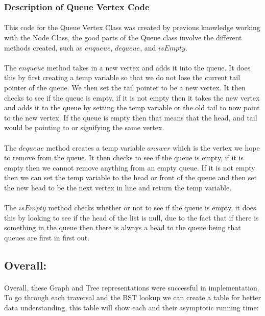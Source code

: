\documentclass[letterpaper, 10pt,DIV=13]{scrartcl}
\numberwithin{equation}{section} %
\numberwithin{figure}{section} %
\numberwithin{table}{section} %
\begin{document}
\subsubsection{Description of Queue Vertex Code}
\paragraph{} This code for the Queue Vertex Class was created by previous knowledge working with the Node Class, the good parts of the Queue class involve the different methods created, such as $enqueue$, $dequeue$, and $isEmpty$.
\paragraph{} The $enqueue$ method takes in a new vertex and adds it into the queue. It does this by first creating a temp variable so that we do not lose the current tail pointer of the queue. We then set the tail pointer to be a new vertex. It then checks to see if the queue is empty, if it is not empty then it takes the new vertex and adds it to the queue by setting the temp variable or the old tail to now point to the new vertex. If the queue is empty then that means that the head, and tail would be pointing to or signifying the same vertex.
\paragraph{} The $dequeue$ method creates a temp variable $answer$ which is the vertex we hope to remove from the queue. It then checks to see if the queue is empty, if it is empty then we cannot remove anything from an empty queue. If it is not empty then we can set the temp variable to the head or front of the queue and then set the new head to be the next vertex in line and return the temp variable.
\paragraph{} The $isEmpty$ method checks whether or not to see if the queue is empty, it does this by looking to see if the head of the list is null, due to the fact that if there is something in the queue then there is always a head to the queue being that queues are first in first out.


\subsection{Overall:}

\paragraph{} Overall, these Graph and Tree representations were successful in implementation. To go through each traversal and the BST lookup we can create a table for better data understanding, this table will show each and their asymptotic running time:
\end{document}
